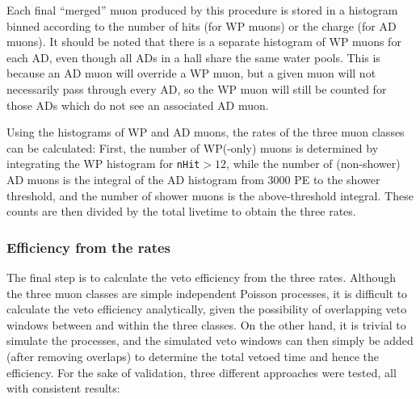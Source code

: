 \documentclass[../thesis.tex]{subfiles}
\begin{document}
Each final ``merged'' muon produced by this procedure is stored in a histogram binned according to the number of hits (for WP muons) or the charge (for AD muons). It should be noted that there is a separate histogram of WP muons for each AD, even though all ADs in a hall share the same water pools. This is because an AD muon will override a WP muon, but a given muon will not necessarily pass through every AD, so the WP muon will still be counted for those ADs which do not see an associated AD muon.

\begin{comment}
  XXX local slides from mid-late Oct for retrigger plots. See misc_ana/MuonVetoEff/condenser4retrig.

Are our efficiencies biased because we don't count for the'' `muon multiplicity efficiency' coming from being falsely ignored as a retrigger?
\end{comment}

Using the histograms of WP and AD muons, the rates of the three muon classes can be calculated: First, the number of WP(-only) muons is determined by integrating the WP histogram for \texttt{nHit}$> 12$, while the number of (non-shower) AD muons is the integral of the AD histogram from 3000 PE to the shower threshold, and the number of shower muons is the above-threshold integral. These counts are then divided by the total livetime to obtain the three rates.

\subsubsection{Efficiency from the rates}
\label{sec:cutVaryMuVetoEffFromRates}

The final step is to calculate the veto efficiency from the three rates. Although the three muon classes are simple independent Poisson processes, it is difficult to calculate the veto efficiency analytically, given the possibility of overlapping veto windows between and within the three classes. On the other hand, it is trivial to simulate the processes, and the simulated veto windows can then simply be added (after removing overlaps) to determine the total vetoed time and hence the efficiency. For the sake of validation, three different approaches were tested, all with consistent results:
\end{document}
